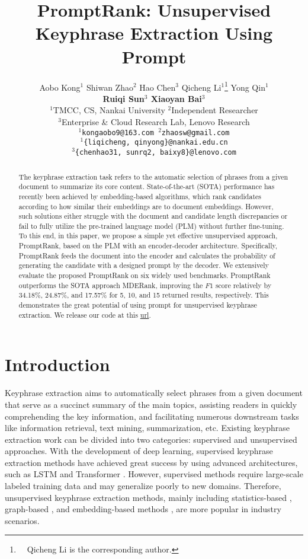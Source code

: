 \documentclass[11pt]{article}
\title{PromptRank: Unsupervised Keyphrase Extraction Using Prompt}
\author{\quad Aobo Kong$^{1}$ \quad Shiwan Zhao$^{2}$ \quad Hao Chen$^{3}$ \quad Qicheng Li$^{1}$\thanks{~~Qicheng Li is the corresponding author.} \quad Yong Qin$^{1}$\\
\textbf{\quad Ruiqi Sun$^{3}$ \quad Xiaoyan Bai$^{3}$}\\
$^1$TMCC, CS, Nankai University \quad $^2$Independent Researcher\\
$^3$Enterprise \& Cloud Research Lab, Lenovo Research \\
\texttt{$^{1}$kongaobo9@163.com \quad $^{2}$zhaosw@gmail.com} \\
\texttt{$^{1}$\{liqicheng, qinyong\}@nankai.edu.cn}\\
\texttt{$^{3}$\{chenhao31, sunrq2, baixy8\}@lenovo.com}\\
}
\begin{document}
\maketitle


  
\begin{abstract}

The keyphrase extraction task refers to the automatic selection of phrases from a given document to summarize its core content. State-of-the-art (SOTA) performance has recently been achieved by embedding-based algorithms, which rank candidates according to how similar their embeddings are to document embeddings. However, such solutions either struggle with the document and candidate length discrepancies or fail to fully utilize the pre-trained language model (PLM) without further fine-tuning. To this end, in this paper, we propose a simple yet effective unsupervised approach, PromptRank, based on the PLM with an encoder-decoder architecture. Specifically, PromptRank feeds the document into the encoder and calculates the probability of generating the candidate with a designed prompt by the decoder. We extensively evaluate the proposed PromptRank on six widely used benchmarks. PromptRank outperforms the SOTA approach MDERank, improving the $F1$ score relatively by 34.18$\%$, 24.87$\%$, and 17.57$\%$ for 5, 10, and 15 returned results, respectively. This demonstrates the great potential of using prompt for unsupervised keyphrase extraction. We release our code at this \href{https://github.com/HLT-NLP/PromptRank}{url}.
\end{abstract}

\section{Introduction}
\label{sec: intro}



Keyphrase extraction aims to automatically select phrases from a given document that serve as a succinct summary of the main topics, assisting readers in quickly comprehending the key information, and facilitating numerous downstream tasks like information retrieval, text mining, summarization, etc. Existing keyphrase extraction work can be divided into two categories: supervised and unsupervised approaches. With the development of deep learning, supervised keyphrase extraction methods have achieved great success by using advanced architectures, such as LSTM \cite{alzaidy2019bi, sahrawat2020keyphrase} and Transformer \cite{santosh-etal-2020-sasake, nikzad2021phraseformer, martinc2022tnt}. However, supervised methods require large-scale labeled training data and may generalize poorly to new domains. Therefore, unsupervised keyphrase extraction methods, mainly including statistics-based \cite{10.1007/978-3-319-56608-5_37, CAMPOS2020257}, graph-based \cite{bougouin-etal-2013-topicrank, boudin-2018-unsupervised}, and embedding-based methods \cite{bennani-smires-etal-2018-simple, zhang-etal-2022-mderank}, are more popular in industry scenarios.
\end{document}
